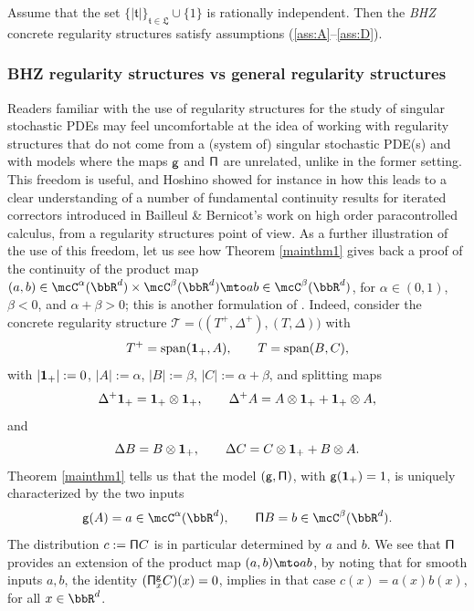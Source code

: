 \begin{thm} \label{mainthm3}
Assume that the set $\{|\mathfrak{t}|\}_{\mathfrak{t}\in\mathfrak{L}}\cup\{1\}$ is rationally independent. Then the \emph{BHZ} concrete regularity structures satisfy assumptions \textup{(\ref{ass:A}--\ref{ass:D})}.
\end{thm}

\subsubsection*{BHZ regularity structures vs general regularity structures}
Readers familiar with the use of regularity structures for the study of singular stochastic PDEs may feel uncomfortable at the idea of working with regularity structures that do not come from a (system of) singular stochastic PDE(s) and with models where the maps $\sf g$ and $\sf\Pi$ are unrelated, unlike in the former setting. This freedom is useful, and Hoshino showed for instance in \cite{HoshinoCommutator1, HoshinoCommutator2} how this leads to a clear understanding of a number of fundamental continuity results for iterated correctors introduced in Bailleul \& Bernicot's work \cite{BB16} on high order paracontrolled calculus, from a regularity structures point of view. As a further illustration of the use of this freedom, let us see how Theorem \ref{mainthm1} gives back a proof of the continuity of the product map $(a,b)\in \mcC^\alpha(\bbR^d)\times \mcC^\beta(\bbR^d) \mto ab\in \mcC^\beta(\bbR^d)$, for $\alpha\in(0,1)$, $\beta<0$, and $\alpha+\beta>0$; this is another formulation of \cite[Prop.\,4.14]{Hai}.
Indeed, consider the concrete regularity structure $\mathscr{T}=\bigl((T^+,\Delta^+), (T,\Delta)\bigr)$ with
\[
T^+ = \textrm{span}({\bf 1}_+, A), \qquad T = \textrm{span}(B,C),
\]
with $\vert{\bf1}_+\vert:=0$, $\vert A\vert:=\alpha$, $\vert B\vert:=\beta$, $\vert C\vert:=\alpha+\beta$, and splitting maps
\[
\Delta^+{\bf 1}_+ = {\bf 1}_+\otimes {\bf 1}_+, \qquad \Delta^+A = A\otimes{\bf 1}_+ + {\bf 1}_+\otimes A,
\]
and
\[
\Delta B = B\otimes {\bf 1}_+, \qquad \Delta C = C\otimes{\bf 1}_+ + B\otimes A.
\]
Theorem \ref{mainthm1} tells us that the model $\sf (g,\Pi)$, with ${\sf g}({\bf 1}_+)=1$, is uniquely characterized by the two inputs
\[
{\sf g}(A) = a\in \mcC^\alpha(\bbR^d), \qquad {\sf \Pi}B = b\in \mcC^\beta(\bbR^d).
\]
The distribution $c:={\sf \Pi}C$ is in particular determined by $a$ and $b$. We see that $\sf \Pi$ provides an extension of the product map $(a,b)\mto ab$, by noting that for smooth inputs $a,b$, the identity $({\sf \Pi}_x^{\sf g}C)(x)=0$, implies in that case $c(x)=a(x)b(x)$, for all $x\in\bbR^d$.

